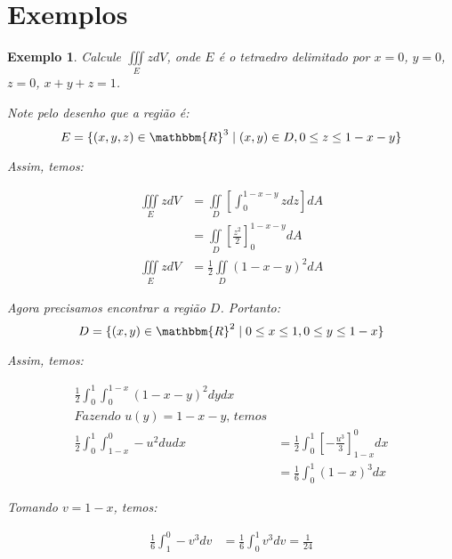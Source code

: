 \documentclass{article}
\newcommand{\REAL}{\mathbbm{R}}
\newcommand{\doubleint}[1] {\iint\limits_D #1 dA}
\newcommand{\tripleint}[1] {\iiint\limits_E #1 dV}
\newtheorem{example}{Exemplo}[section]
\begin{document}
    \section{Exemplos}
        \begin{example}
            Calcule $\tripleint{z}$, onde $E$ é o tetraedro delimitado por $x = 0$, 
            $y = 0$, $z = 0$, $x + y + z = 1$.

            Note pelo desenho que a região é:
            \[
                E = \{ (x,y,z) \in \REAL^3 \mid (x,y) \in D, 0 \leq z \leq 1 - x - y\}
            \]

            Assim, temos:

            \begin{align*}
                \tripleint{z} &= \doubleint{\left[ \int_0^{1-x-y} z dz \right]}\\
                &= \doubleint{\left[ \frac{z^2}{2} \right]_0^{1-x-y}}\\
                \tripleint{z} &= \frac{1}{2} \doubleint{(1 - x - y)^2}
            \end{align*}

            Agora precisamos encontrar a região $D$. Portanto:
            \[ D = \{(x,y) \in \REAL^2 \mid 0 \leq x \leq 1, 0 \leq y \leq 1 - x \} \]

            Assim, temos:

            \begin{align*}
                \frac{1}{2} \int_0^1 \int_0^{1 - x} (1 - x - y)^2 dy dx\\
                \textit{Fazendo }u(y) = 1 - x - y\textit{, temos}\\
                \frac{1}{2} \int_0^1 \int_{1-x}^0 -u^2 du dx &= \frac{1}{2} \int_0^1 \left[ - \frac{u^3}{3} \right]_{1-x}^0 dx\\
                &= \frac{1}{6} \int_0^1 (1 - x)^3 dx
            \end{align*}

            Tomando $v = 1 - x$, temos:

            \begin{align*}
                \frac{1}{6} \int_1^0 -v^3 dv &= \frac{1}{6} \int_0^1 v^3 dv = \frac{1}{24}\\
            \end{align*}
        \end{example}
\end{document}
